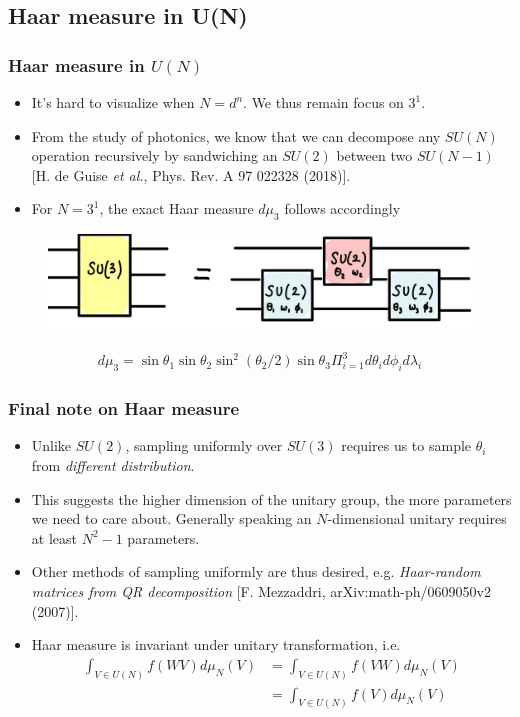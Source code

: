 \documentclass{beamer}
\begin{document}
\subsection{Haar measure in U(N)}
\begin{frame}
  \frametitle{Haar measure in $U(N)$}
  \begin{itemize}
    \item It's hard to visualize when $N=d^n$. We thus remain focus on $3^1$.
    \item From the study of photonics, we know that we can decompose any $SU(N)$ operation recursively by sandwiching an $SU(2)$ between two $SU(N-1)$ [H. de Guise \textit{et al.}, Phys. Rev. A 97 022328 (2018)].
    \item For $N=3^1$, the exact Haar measure $d\mu_3$ follows accordingly
  \end{itemize}
  \begin{figure}
    \centering
    \includegraphics[scale=0.25]{su3_haar.png}
  \end{figure}
  \begin{align} 
    d\mu_3 = \sin\theta_1\sin\theta_2\sin^2(\theta_2/2)\sin\theta_3 \Pi_{i=1}^3 d\theta_i d\phi_i d\lambda_i
  \end{align}
\end{frame}
\begin{frame}
  \frametitle{Final note on Haar measure}
  \begin{itemize}
    \item Unlike $SU(2)$, sampling uniformly over $SU(3)$ requires us to sample $\theta_i$ from \textit{different distribution}.
    \item This suggests the higher dimension of the unitary group, the more parameters we need to care about. Generally speaking an $N$-dimensional unitary requires at least $N^2-1$ parameters. 
    \item Other methods of sampling uniformly are thus desired, e.g. \textit{Haar-random matrices from QR decomposition} [F. Mezzaddri, arXiv:math-ph/0609050v2 (2007)].
    \item Haar measure is invariant under unitary transformation, i.e.
    \begin{align} 
      \int_{V\in U(N)} f(WV)d\mu_N(V) &= \int_{V\in U(N)} f(VW)d\mu_N(V)\nonumber \\
      &= \int_{V\in U(N)} f(V)d\mu_N(V)\nonumber
    \end{align}
  \end{itemize}
\end{frame}
\end{document}
